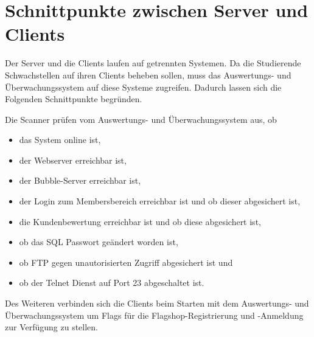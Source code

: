 \section{Schnittpunkte zwischen Server und Clients}
\label{sec:Schnittpunkte_zwischen_Server_und_Clients}

Der Server und die Clients laufen auf getrennten Systemen. Da die Studierende Schwachstellen auf ihren Clients beheben sollen, muss das Auswertungs- und Überwachungssystem auf diese Systeme zugreifen. Dadurch lassen sich die Folgenden Schnittpunkte begründen.

Die Scanner prüfen vom Auswertungs- und Überwachungssystem aus, ob 
\begin{itemize}
	\item das System online ist,
	\item der Webserver erreichbar ist,
	\item der Bubble-Server erreichbar ist,
	\item der Login zum Membersbereich erreichbar ist und ob dieser abgesichert ist,
	\item die Kundenbewertung erreichbar ist und ob diese abgesichert ist,
	\item ob das SQL Passwort geändert worden ist,
	\item ob FTP gegen unautorisierten Zugriff abgesichert ist und
	\item ob der Telnet Dienst auf Port 23 abgeschaltet ist. 
\end{itemize}

Des Weiteren verbinden sich die Clients beim Starten mit dem Auswertungs- und Überwachungssystem um Flags für die Flagshop-Registrierung und -Anmeldung zur Verfügung zu stellen.